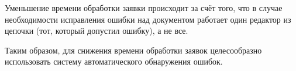 \vspace{\baselineskip}
Уменьшение времени обработки заявки происходит за счёт того, что в случае необходимости исправления ошибки над документом работает один редактор из цепочки (тот, который допустил ошибку), а не все.

\vspace{\baselineskip}
Таким образом, для снижения времени обработки заявок целесообразно использовать систему автоматического обнаружения ошибок.